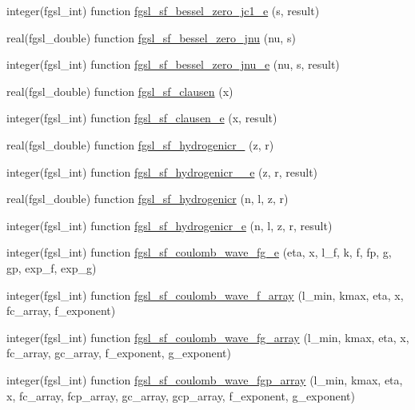\begin{DoxyCompactItemize}
\item 
integer(fgsl\-\_\-int) function \hyperlink{specfunc_8finc_a07b02a139009500202e44b443fb68629}{fgsl\-\_\-sf\-\_\-bessel\-\_\-zero\-\_\-jc1\-\_\-e} (s, result)
\item 
real(fgsl\-\_\-double) function \hyperlink{specfunc_8finc_a2b6a51e0fcaa2078253f433e0d39ac1d}{fgsl\-\_\-sf\-\_\-bessel\-\_\-zero\-\_\-jnu} (nu, s)
\item 
integer(fgsl\-\_\-int) function \hyperlink{specfunc_8finc_a4e22b00fa69e7c5052d064ecbba7284e}{fgsl\-\_\-sf\-\_\-bessel\-\_\-zero\-\_\-jnu\-\_\-e} (nu, s, result)
\item 
real(fgsl\-\_\-double) function \hyperlink{specfunc_8finc_a1b58fdfbc073d6678d5337273b140816}{fgsl\-\_\-sf\-\_\-clausen} (x)
\item 
integer(fgsl\-\_\-int) function \hyperlink{specfunc_8finc_a9792a5504136b8a7b5a4d8fae4a4c6de}{fgsl\-\_\-sf\-\_\-clausen\-\_\-e} (x, result)
\item 
real(fgsl\-\_\-double) function \hyperlink{specfunc_8finc_ae6ef61980500abaf485ac9e5029ffcf4}{fgsl\-\_\-sf\-\_\-hydrogenicr\-\_} (z, r)
\item 
integer(fgsl\-\_\-int) function \hyperlink{specfunc_8finc_a1de0cb50a7d57621c2ee852e68de8172}{fgsl\-\_\-sf\-\_\-hydrogenicr\-\_\-\_\-e} (z, r, result)
\item 
real(fgsl\-\_\-double) function \hyperlink{specfunc_8finc_a9cbd481a2f8c7bad674927e1f3307c2d}{fgsl\-\_\-sf\-\_\-hydrogenicr} (n, l, z, r)
\item 
integer(fgsl\-\_\-int) function \hyperlink{specfunc_8finc_aa17737135642df0a246210aa5d83bcf9}{fgsl\-\_\-sf\-\_\-hydrogenicr\-\_\-e} (n, l, z, r, result)
\item 
integer(fgsl\-\_\-int) function \hyperlink{specfunc_8finc_af1f9930ebb769e81b695b20e1b4b232a}{fgsl\-\_\-sf\-\_\-coulomb\-\_\-wave\-\_\-fg\-\_\-e} (eta, x, l\-\_\-f, k, f, fp, g, gp, exp\-\_\-f, exp\-\_\-g)
\item 
integer(fgsl\-\_\-int) function \hyperlink{specfunc_8finc_acef9a2dc73a5a28850e696ed71a99566}{fgsl\-\_\-sf\-\_\-coulomb\-\_\-wave\-\_\-f\-\_\-array} (l\-\_\-min, kmax, eta, x, fc\-\_\-array, f\-\_\-exponent)
\item 
integer(fgsl\-\_\-int) function \hyperlink{specfunc_8finc_a052fc18829041d8a732a3341f0ef78c1}{fgsl\-\_\-sf\-\_\-coulomb\-\_\-wave\-\_\-fg\-\_\-array} (l\-\_\-min, kmax, eta, x, fc\-\_\-array, gc\-\_\-array, f\-\_\-exponent, g\-\_\-exponent)
\item 
integer(fgsl\-\_\-int) function \hyperlink{specfunc_8finc_a8b506e9cd4c5f3f69723392bbefdc5fb}{fgsl\-\_\-sf\-\_\-coulomb\-\_\-wave\-\_\-fgp\-\_\-array} (l\-\_\-min, kmax, eta, x, fc\-\_\-array, fcp\-\_\-array, gc\-\_\-array, gcp\-\_\-array, f\-\_\-exponent, g\-\_\-exponent)

\end{DoxyCompactItemize}
